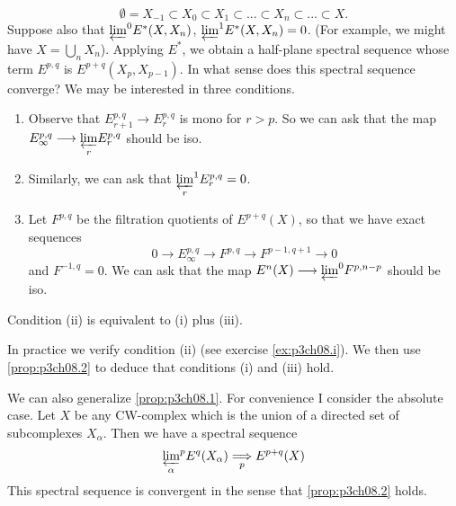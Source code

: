 \documentclass[../main]{subfiles}
\begin{document}
\[\emptyset = X_{-1}\subset X_0\subset X_1\subset ... \subset X_n\subset ... \subset X.\]
Suppose also that ${\varprojlim}^0E^*(X,X_n)$,  ${\varprojlim}^1E^*(X,X_n)=0$. (For example, we might have $X=\bigcup_nX_n$). Applying $E^*$, we obtain a half-plane spectral sequence whose term $E^{p,q}$ is $E^{p+q}(X_p, X_{p-1})$. In what sense does this spectral sequence converge? We may be interested in three conditions.
\begin{enumerate}[wide=\parindent]
    \item Observe that $E_{r+1}^{p,q}\longrightarrow E_r^{p,q}$ is mono for $r>p$. So we can ask that the map $E_\infty^{p,q}\longrightarrow \underset{r}{\varprojlim} E_r^{p,q}$ should be iso.
    \item Similarly, we can ask that $\underset{r}{\varprojlim}^1E_r^{p,q}=0$.
    \item Let $F^{p,q}$ be the filtration quotients of $E^{p+q}(X)$, so that we have exact sequences
    \[0\longrightarrow E_{\infty}^{p,q}\longrightarrow F^{p,q} \longrightarrow F^{p-1,q+1} \longrightarrow 0\]
    and $F^{-1,q}=0$. We can ask that the map $E^n(X)\longrightarrow {\varprojlim}^0F^{p,n-p}$ should be iso.
\end{enumerate}
\begin{theorem}\label{prop:p3ch08.2}
Condition (ii) is equivalent to (i) plus (iii). 
\end{theorem}
In practice we verify condition (ii) (see exercise \ref{ex:p3ch08.i}). We then use \ref{prop:p3ch08.2} to deduce that conditions (i) and (iii) hold.
\par We can also generalize \ref{prop:p3ch08.1}. For convenience I consider the absolute case. Let $X$ be any CW-complex which is the union of a directed set of subcomplexes $X_\alpha$. Then we have a spectral sequence
\[{\varprojlim_\alpha}^pE^q(X_\alpha) \underset{p}{\Longrightarrow} E^{p+q}(X)\]
This spectral sequence is convergent in the sense that \ref{prop:p3ch08.2} holds.
\end{document}
